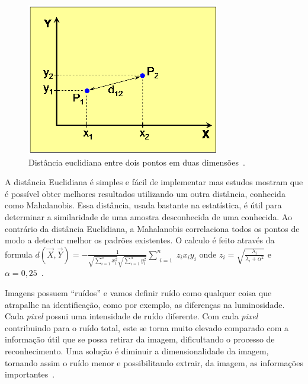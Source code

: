     \begin{figure}[H]
		\begin{center}
			\includegraphics[scale=1.0]{figuras/2.FundamentacaoTeorica/graficoDistanciaEntrePontos.png}
		\end{center}
		\caption{Distância euclidiana entre dois pontos em duas dimensões~\cite{hewitt}.}
		\label{distanciaEntrePontos}
	\end{figure}

A distância Euclidiana é simples e fácil de implementar mas estudos mostram que é possível obter melhores resultados utilizando um outra distância, conhecida como Mahalanobis. Essa distância, usada bastante na estatística, é útil para determinar a similaridade de uma amostra desconhecida de uma conhecida. Ao contrário da distância Euclidiana, a Mahalanobis correlaciona todos os pontos de modo a detectar melhor os padrões existentes. O calculo é feito através da formula $\displaystyle d(\vec{X}, \vec{Y}) =  - \frac{1}{\sqrt{\sum_{i=1}^{n} x_i^2} \sqrt{\sum_{i=1}^{n} y_i^2}}   \sum_{\substack{i=1}}^{n} z_ix_iy_i$ onde $\displaystyle z_i = \sqrt{\frac{\lambda_i}{\lambda_i + \alpha^2}}$ e $\displaystyle \alpha = 0,25$~\cite{perlibakas}.

Imagens possuem ``ruídos'' e vamos definir ruído como qualquer coisa que atrapalhe na identificação, como por exemplo, as diferenças na luminosidade. Cada \textit{pixel} possui uma intensidade de ruído diferente. Com cada \textit{pixel} contribuindo para o ruído total, este se torna muito elevado comparado com a informação útil que se possa retirar da imagem, dificultando o processo de reconhecimento. Uma solução é diminuir a dimensionalidade da imagem, tornando assim o ruído menor e possibilitando extrair, da imagem, as informações importantes~\cite{hewitt}.


